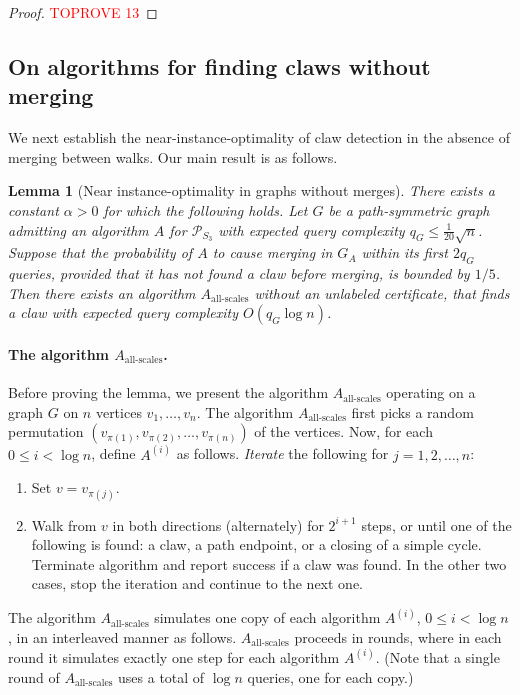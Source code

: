 \documentclass[11pt]{article}
\numberwithin{equation}{section}
\newtheorem{lemma}[lemma]{Lemma}
\renewcommand{\P}{\mathcal{P}}
\newcommand{\1}{\mathbf{1}}
\begin{document}
\begin{proof}\textcolor{red}{TOPROVE 13}\end{proof}

\subsection{On algorithms for finding claws without merging}\label{sec:final}
We next establish the near-instance-optimality of claw detection in the absence of merging between walks. Our main result is as follows. 

\begin{lemma}[Near instance-optimality in graphs without merges]
\label{lem:instance_optimality_graphs_no_merges}
There exists a constant $\alpha > 0$ for which the following holds.
Let $G$ be a path-symmetric graph admitting an algorithm $A$ for $\P_{S_3}$ with expected query complexity $q_G \leq \frac{1}{20}\sqrt{n}$. Suppose that the probability of $A$ to cause merging in $G_A$ within its first $2q_G$ queries, provided that it has not found a claw before merging, is bounded by $1/5$. 
Then there exists an algorithm $A_{\text{all-scales}}$ without an unlabeled certificate, that finds a claw with expected query complexity $O(q_G \log n)$.
\end{lemma}

\paragraph{The algorithm $A_{\text{all-scales}}$.}
Before proving the lemma, we present the  algorithm $A_{\text{all-scales}}$ operating on a graph $G$ on $n$ vertices $v_1, \ldots, v_n$. The algorithm $A_{\text{all-scales}}$ first picks a random permutation $(v_{\pi(1)}, v_{\pi(2)}, \ldots, v_{\pi(n)})$ of the vertices. Now, for each $0 \leq i < \log n$, define $A^{(i)}$ as follows. 
\textit{Iterate} the following for $j=1,2,\ldots,n$: 
\begin{enumerate}
\item Set $v = v_{\pi(j)}$.
\item Walk from $v$ in both directions (alternately) for $2^{i+1}$ steps, or until one of the following is found: a claw, a path endpoint, or a closing of a simple cycle. Terminate algorithm and report success if a claw was found. In the other two cases, stop the iteration and continue to the next one.
\end{enumerate}

The algorithm $A_{\text{all-scales}}$ simulates one copy of each algorithm $A^{(i)}$, $0 \leq i < \log n$, in an interleaved manner as follows. $A_{\text{all-scales}}$ proceeds in rounds, where in each round it simulates exactly one step for each algorithm $A^{(i)}$. (Note that a single round of $A_{\text{all-scales}}$ uses a total of $\log n$ queries, one for each copy.)
\end{document}

